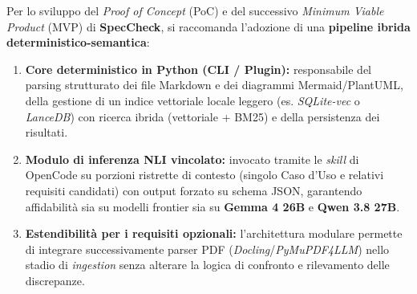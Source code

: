 \documentclass[a4paper, 11pt]{article}
\begin{document}
Per lo sviluppo del \textit{Proof of Concept} (PoC) e del successivo \textit{Minimum Viable Product} (MVP) di \textbf{SpecCheck}, si raccomanda l'adozione di una \textbf{pipeline ibrida deterministico-semantica}:
\begin{enumerate}[noitemsep]
    \item \textbf{Core deterministico in Python (CLI / Plugin):} responsabile del parsing strutturato dei file Markdown e dei diagrammi Mermaid/PlantUML, della gestione di un indice vettoriale locale leggero (es. \textit{SQLite-vec} o \textit{LanceDB}) con ricerca ibrida (vettoriale + BM25) e della persistenza dei risultati.
    \item \textbf{Modulo di inferenza NLI vincolato:} invocato tramite le \textit{skill} di OpenCode su porzioni ristrette di contesto (singolo Caso d'Uso e relativi requisiti candidati) con output forzato su schema JSON, garantendo affidabilità sia su modelli frontier sia su \textbf{Gemma 4 26B} e \textbf{Qwen 3.8 27B}.
    \item \textbf{Estendibilità per i requisiti opzionali:} l'architettura modulare permette di integrare successivamente parser PDF (\textit{Docling}/\textit{PyMuPDF4LLM}) nello stadio di \textit{ingestion} senza alterare la logica di confronto e rilevamento delle discrepanze.
\end{enumerate}
\end{document}
